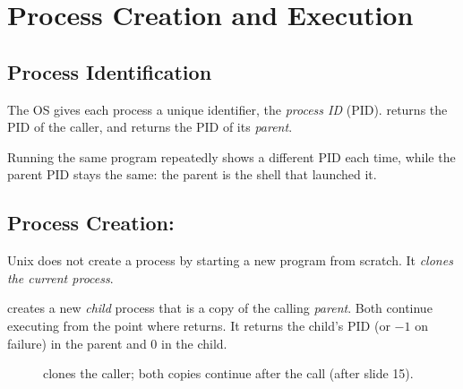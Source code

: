 \section{Process Creation and Execution}
\label{sec:fork}

\subsection{Process Identification}

\begin{definition}[PID]
  The OS gives each process a unique identifier, the \emph{process ID} (PID).  returns the PID of the caller, and  returns the PID of its \emph{parent}.
\end{definition}

Running the same program repeatedly shows a different PID each time, while the parent PID stays the same: the parent is the shell that launched it.

\subsection{Process Creation: \texorpdfstring{}{fork()}}

Unix does not create a process by starting a new program from scratch. It \emph{clones the current process}.

\begin{definition}
   creates a new \emph{child} process that is a copy of the calling \emph{parent}. Both continue executing from the point where  returns. It returns the child's PID (or $-1$ on failure) in the parent and $0$ in the child.
\end{definition}

\begin{figure}[htbp]
\centering
{}
\caption{ clones the caller; both copies continue after the call (after slide 15).}
\label{fig:fork}
\end{figure}


